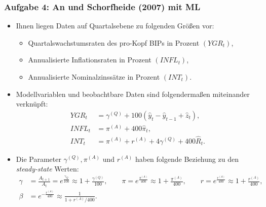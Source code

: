 \documentclass{beamer} %
\begin{document}
\begin{frame}\frametitle{Aufgabe 4: An und Schorfheide (2007) mit ML}
\begin{itemize}
\item Ihnen liegen Daten auf Quartalsebene zu folgenden Größen vor:
\begin{itemize}
  \item Quartalswachstumsraten des pro-Kopf BIPs in Prozent $(YGR_t)$,
  \item Annualisierte Inflationsraten in Prozent $(INFL_t)$,
  \item Annualisierte Nominalzinssätze in Prozent $(INT_t)$.
\end{itemize}
\item Modellvariablen und beobachtbare Daten sind folgendermaßen miteinander verknüpft:
\begin{align*}
  YGR_t &= \gamma^{(Q)} + 100(\widehat{y}_t-\widehat{y}_{t-1}+\widehat{z}_t),\\
  INFL_t &= \pi^{(A)} + 400 \widehat{\pi}_t,\\
  INT_t &= \pi^{(A)} + r^{(A)} + 4 \gamma^{(Q)} + 400 \widehat{R}_t.
\end{align*}
\item Die Parameter $\gamma^{(Q)}, \pi^{(A)}$ und $r^{(A)}$ haben folgende
Beziehung zu den \emph{steady-state} Werten:
\scriptsize\begin{align*}
  \gamma &=\frac{A_{t+1}}{A_t}= e^{\frac{\gamma_Q}{100}} \approx 1+\frac{\gamma^{(Q)}}{100}, \qquad   \pi = e^{\frac{\pi^{(A)}}{400}} \approx 1+\frac{\pi^{(A)}}{400},\qquad r = e^{\frac{r^{(A)}}{400}} \approx 1+\frac{r^{(A)}}{400},\\
  \beta&=e^{-\frac{r^{(A)}}{400}} \approx \frac{1}{1+r^{(A)}/400}.
\end{align*}
\end{itemize}
\end{frame}
\end{document}
